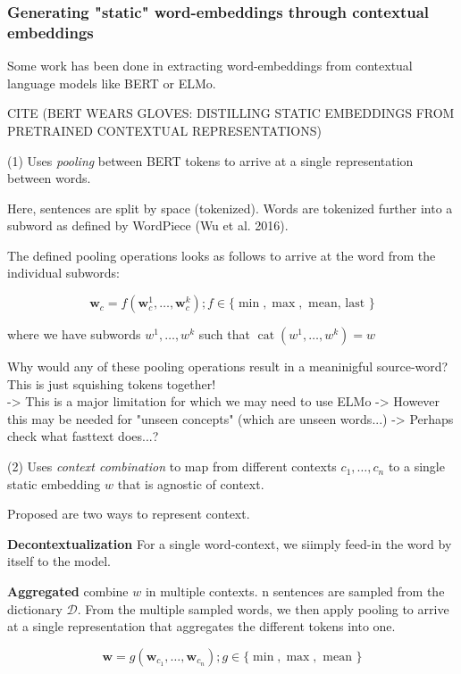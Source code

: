 \documentclass[a4paper,12pt,twoside,openright]{report}
\begin{document}
\subsubsection{Generating "static" word-embeddings through contextual embeddings}

Some work has been done in extracting word-embeddings from contextual language models like BERT or ELMo.

CITE (BERT WEARS GLOVES: DISTILLING STATIC EMBEDDINGS FROM PRETRAINED CONTEXTUAL REPRESENTATIONS)

(1) Uses \textit{pooling} between BERT tokens to arrive at a single representation between words.

Here, sentences are split by space (tokenized).
Words are tokenized further into a subword as defined by WordPiece (Wu et al. 2016).

The defined pooling operations looks as follows to arrive at the word from the individual subwords:

$$
\mathbf{w}_{c}=f\left(\mathbf{w}_{c}^{1}, \ldots, \mathbf{w}_{c}^{k}\right) ; f \in\{\min , \max , \text { mean, last }\}
$$

where we have subwords $w^{1},  \ldots, w^{k}$ such that $\operatorname{cat}\left(w^{1}, \ldots, w^{k}\right)=w$

Why would any of these pooling operations result in a meaninigful source-word? 
This is just squishing tokens together! \\

-> This is a major limitation for which we may need to use ELMo
-> However this may be needed for "unseen concepts" (which are unseen words...)
-> Perhaps check what fasttext does...?


(2) Uses \textit{context combination} to map from different contexts $c_1, \ldots, c_n$ to a single static embedding $w$ that is agnostic of context.

Proposed are two ways to represent context.

\textbf{Decontextualization} For a single word-context, we siimply feed-in the word by itself to the model.

\textbf{Aggregated} combine $w$ in multiple contexts.
n sentences are sampled from the dictionary $\mathcal{D}$.
From the multiple sampled words, we then apply pooling to arrive at a single representation that aggregates the different tokens into one.

$$
\mathbf{w}=g\left(\mathbf{w}_{c_{1}}, \dots, \mathbf{w}_{c_{n}}\right) ; g \in\{\min , \max , \text { mean }\}
$$
\end{document}
